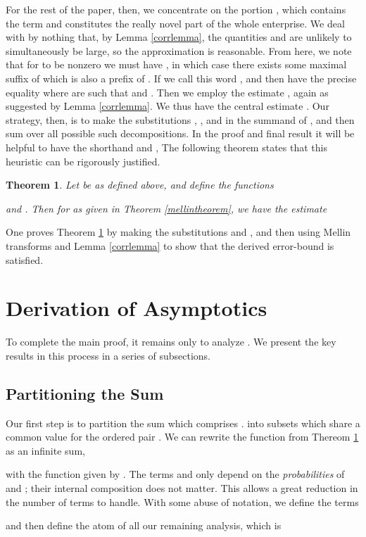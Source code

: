 \documentclass[proceedings]{aofa}
\newtheorem{theorem}{Theorem}
\begin{document}
For the rest of the paper, then, we concentrate on the portion , which contains the term  and constitutes the really novel part of the whole enterprise. We deal with  by nothing that, by Lemma \ref{corrlemma}, the quantities  and  are unlikely
to simultaneously be large, so the approximation
 is reasonable. From here, we note that for  to be nonzero we must have , in which case there exists some maximal suffix of  which is also a
prefix of . If we call this word , and then have the precise
equality  where
 are such that  and
. Then we employ the estimate , again as suggested by Lemma \ref{corrlemma}. We thus have the central estimate
.
Our strategy, then, is to make the substitutions ,
, and  in the summand of , 
and then sum over all possible such decompositions. In the proof and final result it will be  helpful to have the shorthand 
 and ,
The following theorem states that this heuristic can be rigorously justified.
\begin{theorem}\label{thetatheorem}
Let  be as defined above, and define the functions

and
.
Then for  as given in Theorem \ref{mellintheorem}, we have the estimate

\end{theorem}
One proves Theorem \ref{thetatheorem} by making the substitutions  and , and then using Mellin transforms and Lemma \ref{corrlemma} to show that the derived error-bound is satisfied.


\section{Derivation of Asymptotics}
To complete the main proof, it remains only to analyze . We present the key results in this process in a series of subsections.
\subsection{Partitioning the Sum}
Our first step is to partition the sum which comprises . 
into subsets which share a common value for the ordered pair . We can rewrite the function  from Thereom \ref{thetatheorem} as an infinite sum, 

with the function   given by
.
The terms  and  only depend on the \emph{probabilities} of  and ; their internal composition does not matter. This allows a great reduction in the number of terms to handle. With some abuse of notation, we define the terms

and then define the atom of all our remaining analysis, which is
\end{document}
